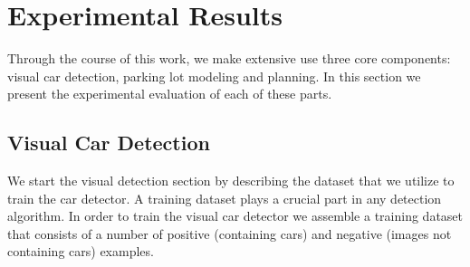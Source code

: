 
\chapter{Experimental Results}
\label{cha:experimental_results}

Through the course of this work, we make extensive use three core components:
visual car detection, parking lot modeling and planning. In this section we
present the experimental evaluation of each of these parts.

\section{Visual Car Detection}
\label{sec:visual_car_detection}

We start the visual detection section by describing the dataset that we
utilize to train the car detector. A training dataset plays a crucial part in
any detection algorithm. In order to train the visual car detector we assemble
a training dataset that consists of a number of positive (containing cars) and
negative (images not containing cars) examples.


